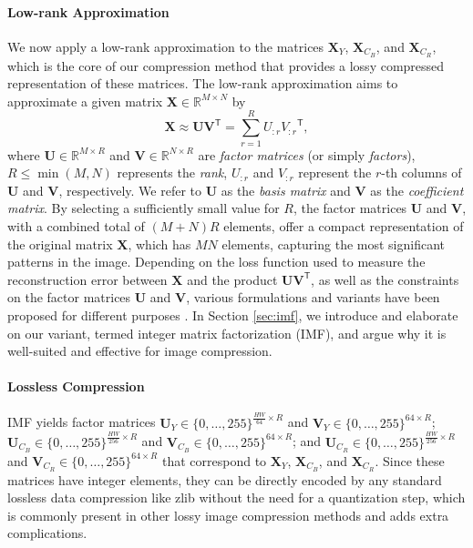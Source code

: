 \paragraph{Low-rank Approximation}
We now apply a low-rank approximation to the matrices $\bm{X}_{Y}$, $\bm{X}_{C_B}$, and $\bm{X}_{C_R}$, which is the core of our compression method that provides a lossy compressed representation of these matrices.  The low-rank approximation \cite{eckart1936approximation} aims to approximate a given matrix $ \bm{X} \in \mathbb{R}^{M \times N} $ by
\begin{equation} \label{eq:lra}
    \bm{X} \approx \bm{U} \bm{V}^\mathsf{T} = \sum_{r=1}^{R} U_{:r} {V_{:r}}^\mathsf{T},
\end{equation}
where $\bm{U} \in \mathbb{R}^{M \times R}$ and $\bm{V} \in \mathbb{R}^{N \times R}$ are \emph{factor matrices} (or simply \emph{factors}), $R \leq \min(M,N)$ represents the \emph{rank}, $U_{:r}$ and $V_{:r}$ represent the $r$-th columns of $\bm{U}$ and $\bm{V}$, respectively. We refer to $\bm{U}$ as the \emph{basis matrix} and $\bm{V}$ as the \emph{coefficient matrix}. By selecting a sufficiently small value for $R$, the factor matrices $\bm{U}$ and $\bm{V}$, with a combined total of $(M+N)R$ elements, offer a compact representation of the original matrix $\bm{X}$, which has $MN$ elements, capturing the most significant patterns in the image. Depending on the loss function used to measure the reconstruction error between $\bm{X}$ and the product $\bm{U} \bm{V}^\mathsf{T}$, as well as the constraints on the factor matrices $\bm{U}$ and $\bm{V}$, various formulations and variants have been proposed for different purposes \cite{lee2000algorithms, ding2008convex, lin2005integer}. In Section \ref{sec:imf}, we introduce and elaborate on our variant, termed integer matrix factorization (IMF), and argue why it is well-suited and effective for image compression.


\paragraph{Lossless Compression}
IMF yields factor matrices $\bm{U}_{Y} \in \{0, \ldots, 255\}^{\frac{HW}{64} \times R}$ and $\bm{V}_{Y} \in \{0, \ldots, 255\}^{64 \times R}$; $\bm{U}_{C_B} \in \{0, \ldots, 255\}^{\frac{HW}{256} \times R}$ and $\bm{V}_{C_B} \in \{0, \ldots, 255\}^{64 \times R}$; and $\bm{U}_{C_R} \in \{0, \ldots, 255\}^{\frac{HW}{256} \times R}$ and $\bm{V}_{C_R} \in \{0, \ldots, 255\}^{64 \times R}$ that correspond to $\bm{X}_{Y}$, $\bm{X}_{C_B}$, and $\bm{X}_{C_R}$. Since these matrices have integer elements, they can be directly encoded by any standard lossless data compression like zlib \cite{deutsch1996zlib} without the need for a quantization step, which is commonly present in other lossy image compression methods and adds extra complications.

